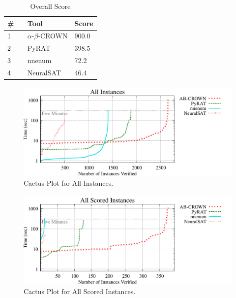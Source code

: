 

\begin{table}[h]
\begin{center}
\caption{Overall Score} \label{tab:score}
{\setlength{\tabcolsep}{2pt}
\begin{tabular}[h]{@{}lll@{}}
\toprule
\textbf{\# ~} & \textbf{Tool} & \textbf{Score}\\
\midrule
1 & $\alpha$-$\beta$-CROWN & 900.0 \\
2 & PyRAT & 398.5 \\
3 & nnenum & 72.2 \\
4 & NeuralSAT & 46.4 \\
\bottomrule
\end{tabular}
}
\end{center}
\end{table}



\begin{figure}[h]
\centerline{\includegraphics[width=\textwidth]{cactus/all.pdf}}
\caption{Cactus Plot for All Instances.}
\label{fig:quantPic}
\end{figure}


\begin{figure}[h]
\centerline{\includegraphics[width=\textwidth]{cactus/all_scored.pdf}}
\caption{Cactus Plot for All Scored Instances.}
\label{fig:quantPic}
\end{figure}

